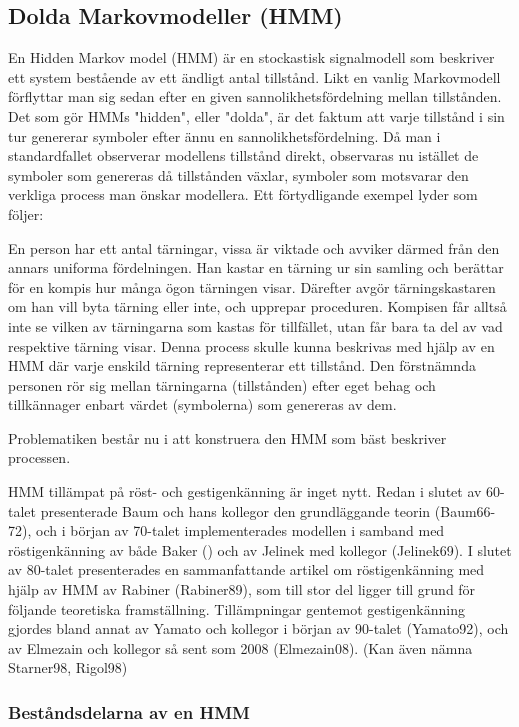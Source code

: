 \documentclass[../rapport_MVEX01-11-05]{subfiles}
\begin{document}
\subsection{Dolda Markovmodeller (HMM)}

En Hidden Markov model (HMM) är en stockastisk signalmodell som
beskriver ett system bestående av ett ändligt antal tillstånd. Likt en
vanlig Markovmodell förflyttar man sig sedan efter en given
sannolikhetsfördelning mellan tillstånden. Det som gör HMMs "hidden",
eller "dolda", är det faktum att varje tillstånd i sin tur genererar
symboler efter ännu en sannolikhetsfördelning. Då man i standardfallet
observerar modellens tillstånd direkt, observaras nu istället de
symboler som genereras då tillstånden växlar, symboler som motsvarar
den verkliga process man önskar modellera. Ett förtydligande exempel
lyder som följer: 

En person har ett antal tärningar, vissa är viktade och avviker därmed
från den annars uniforma fördelningen. Han kastar en tärning ur sin
samling och berättar för en kompis hur många ögon tärningen
visar. Därefter avgör tärningskastaren om han vill byta tärning eller
inte, och upprepar proceduren. Kompisen får alltså inte se vilken av
tärningarna som kastas för tillfället, utan får bara ta del av vad
respektive tärning visar. Denna process skulle kunna beskrivas med
hjälp av en HMM där varje enskild tärning representerar ett
tillstånd. Den förstnämnda personen rör sig mellan tärningarna
(tillstånden) efter eget behag och tillkännager enbart värdet
(symbolerna) som genereras av dem. 

Problematiken består nu i att konstruera den HMM som bäst beskriver
processen.  

HMM tillämpat på röst- och gestigenkänning är inget nytt. Redan i
slutet av 60-talet presenterade Baum och hans kollegor den
grundläggande teorin (Baum66-72), och i början av 70-talet
implementerades modellen i samband med röstigenkänning av både Baker
(\cite{Baker75}) och av Jelinek med kollegor (Jelinek69). I slutet av
80-talet presenterades en sammanfattande artikel om röstigenkänning
med hjälp av HMM av Rabiner (Rabiner89), som till stor del ligger till
grund för följande teoretiska framställning. Tillämpningar gentemot
gestigenkänning gjordes bland annat av Yamato och kollegor i början av
90-talet (Yamato92), och av Elmezain och kollegor så sent som 2008
(Elmezain08). (Kan även nämna Starner98, Rigol98)

\subsubsection{Beståndsdelarna av en HMM}
\end{document}
